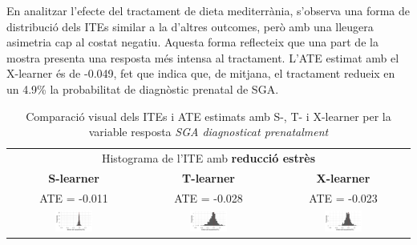 \documentclass[../main.tex]{subfiles}
\begin{document}
    En analitzar l’efecte del tractament de dieta mediterrània, s’observa una forma de distribució dels ITEs similar a la d’altres outcomes, però amb una lleugera asimetria cap al costat negatiu. Aquesta forma reflecteix que una part de la mostra presenta una resposta més intensa al tractament. L’ATE estimat amb el X-learner és de -0.049, fet que indica que, de mitjana, el tractament redueix en un 4.9\% la probabilitat de diagnòstic prenatal de SGA.
    
    
    \begin{table}[H]
        \centering
        \begin{tabular}{ccc}
        \multicolumn{3}{c}{Histograma de l'ITE amb \textbf{reducció estrès}} \\
        \small \textbf{S-learner} & \small \textbf{T-learner} & \small \textbf{X-learner} \\
        \footnotesize ATE = -0.011 & \footnotesize ATE = -0.028 & \footnotesize ATE = -0.023 \\
        \includegraphics[width=0.3\textwidth]{imgs/histogrames/hist(SGA_prenatal)S_tract3.jpg} &
        \includegraphics[width=0.3\textwidth]{imgs/histogrames/hist(SGA_prenatal)T_tract3.jpg} &
        \includegraphics[width=0.3\textwidth]{imgs/histogrames/hist(SGA_prenatal)X_tract3.jpg} \\
        \end{tabular}
        \caption{\footnotesize Comparació visual dels ITEs i ATE estimats amb S-, T- i X-learner per la variable resposta \textit{SGA diagnosticat prenatalment}}
        \label{tab:histITE_prenatSGA3}
    \end{table}
\end{document}
